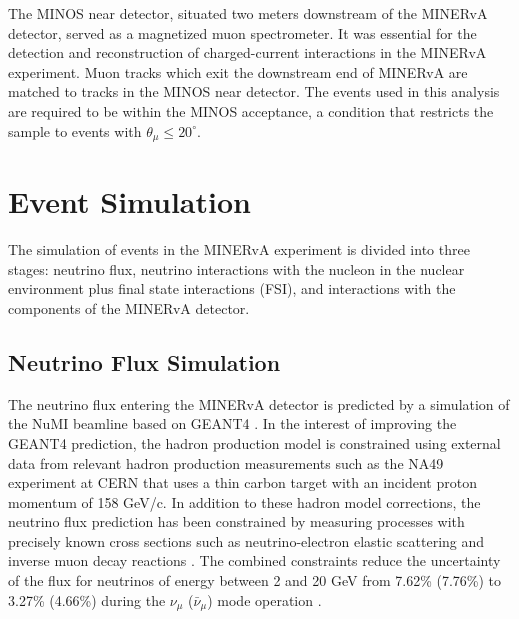 \documentclass[aps, prd, twocolumn, showpacs, superscriptaddress, floatfix]{revtex4-2}
\begin{document}
The MINOS near detector, situated two meters downstream of the MINERvA detector, served as a magnetized muon spectrometer. It was essential for the detection and reconstruction of charged-current interactions in the MINERvA experiment. Muon tracks which exit the downstream end of MINERvA are matched to tracks in the MINOS near detector. The events used in this analysis are required to be within the MINOS acceptance, a condition that restricts the sample to events with $\theta_\mu \leq 20^\circ$.

\section{Event Simulation}
\label{Simulation Experiment}
The simulation of events in the MINERvA experiment is divided into three stages: neutrino flux, neutrino interactions with the nucleon in the nuclear environment plus final state interactions (FSI), and interactions with the components of the MINERvA detector.

\subsection{Neutrino Flux Simulation}
The neutrino flux entering the MINERvA detector is predicted by a simulation of the NuMI beamline based on GEANT4 \cite{Agostinelli2003}. In the interest of improving the GEANT4 prediction, the hadron production model is constrained \cite{AliagaThesis2016, Aliaga2016} using external data from relevant hadron production measurements such as the NA49 experiment \cite{NA49exp2007} at CERN that uses a thin carbon target with an incident proton momentum of 158 GeV/c. In addition to these hadron model corrections, the neutrino flux prediction has been constrained by measuring processes with precisely known cross sections such as neutrino-electron elastic scattering \cite{Valencia2019} and inverse muon decay reactions \cite{RuterboriesIMD2021}. The combined constraints reduce the uncertainty of the flux for neutrinos of energy between 2 and 20 GeV from 7.62\% (7.76\%) to 3.27\% (4.66\%) during the $\nu_\mu$ ($\bar{\nu}_\mu$) mode operation \cite{Zazueta2023}.
\end{document}
